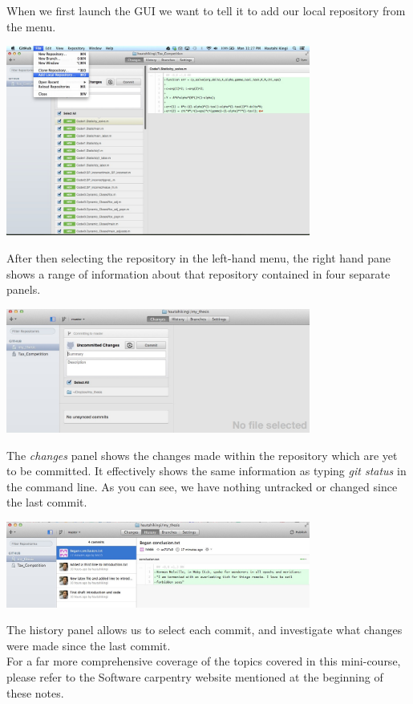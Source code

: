 \documentclass{article}
\begin{document}
When we first launch the GUI we want to tell it to add our local repository from the menu.
\begin{center}
\includegraphics[width=10cm]{./auxfiles/GUI_add.jpg}
\end{center}
After then selecting the repository in the left-hand menu, the right hand pane shows a range of information about that repository contained in four separate panels.
\begin{center}
\includegraphics[width=10cm]{./auxfiles/GUI_changes.jpg}
\end{center}
The \emph{changes} panel shows the changes made within the repository which are yet to be committed. It effectively shows the same information as typing \emph{git status} in the command line. As you can see, we have nothing untracked or changed since the last commit.
\begin{center}
\includegraphics[width=10cm]{./auxfiles/GUI_history.jpg}
\end{center}
The history panel allows us to select each commit, and investigate what changes were made since the last commit.\\


%


For a far more comprehensive coverage of the topics covered in this mini-course, please refer to the Software carpentry website mentioned at the beginning of these notes.
\end{document}
